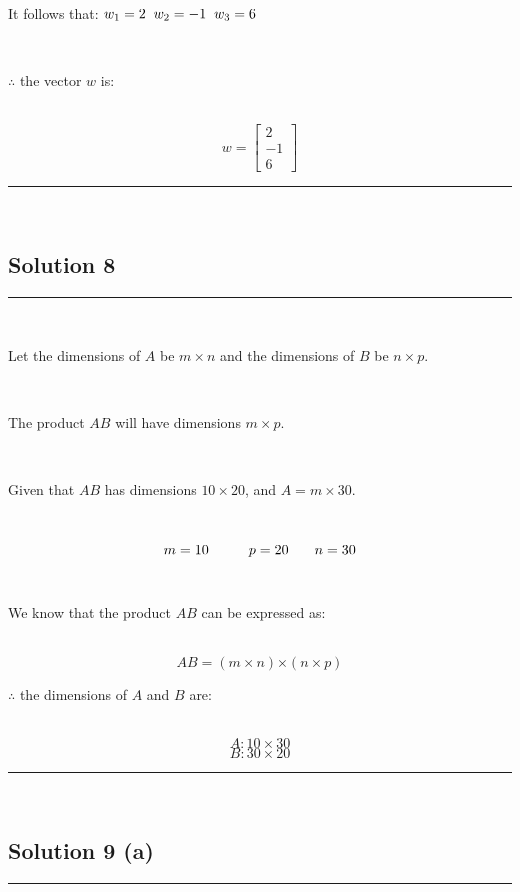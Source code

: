 \documentclass{article}
\begin{document}
\parbox{\textwidth}{It follows that: $w_1 = 2 \hspace{0.2cm} w_2=-1 \hspace{0.2cm} w_3 = 6$}\\

\parbox{\textwidth}{$\therefore$ the vector $w$ is:}\\

$$w = \begin{bmatrix} 2 \\ -1 \\ 6 \end{bmatrix}$$

\noindent\rule{\textwidth}{0.4pt}\\
\newpage
\subsection*{Solution 8}
\noindent\rule{\textwidth}{0.4pt}\\

\parbox{\textwidth}{Let the dimensions of $A$ be $m \times n$ and the dimensions of $B$ be $n \times p$.}\\

\parbox{\textwidth}{The product $AB$ will have dimensions $m \times p$.}\\

\parbox{\textwidth}{Given that $AB$ has dimensions $10 \times 20$, and $A = m \times 30$.}\\

$$m = 10 \quad \hspace{0.3cm} \quad p = 20 \hspace{0.3cm} \quad n = 30$$\\

\parbox{\textwidth}{We know that the product $AB$ can be expressed as:}\\

$$AB = (m\times n)\boldsymbol{\times} (n\times p)$$

\parbox{\textwidth}{$\therefore$ the dimensions of $A$ and $B$ are:}\\
$$A: 10 \times 30$$
$$B: 30 \times 20$$

\noindent\rule{\textwidth}{0.4pt}\\

\newpage
\subsection*{Solution 9 (a)}
\noindent\rule{\textwidth}{0.4pt}\\
\end{document}
